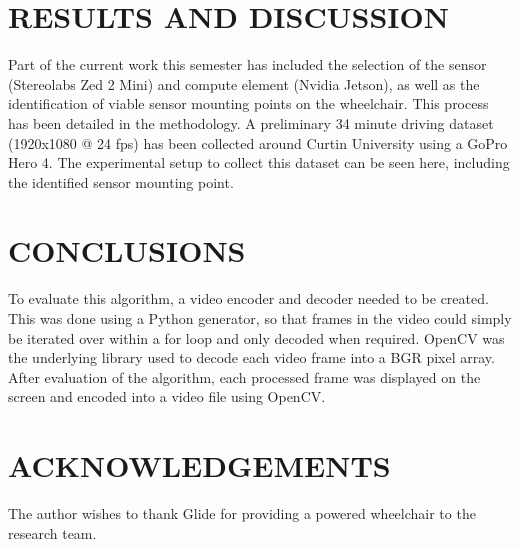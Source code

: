 \documentclass[10pt,twoside]{article}
\begin{document}
\section*{\textbf{RESULTS AND DISCUSSION}} %
Part of the current work this semester has included the selection of the sensor (Stereolabs Zed 2 Mini) and compute element (Nvidia Jetson),
as well as the identification of viable sensor mounting points on the wheelchair. This process has been detailed in the methodology.
A preliminary 34 minute driving dataset (1920x1080 @ 24 fps) has been collected around Curtin University using a GoPro Hero 4.
The experimental setup to collect this dataset can be seen here, including the identified
sensor mounting point.

\section*{\textbf{CONCLUSIONS}} %
To evaluate this algorithm, a video encoder and decoder needed to be created. This was done using a Python generator,
so that frames in the video could simply be iterated over within a for loop and only decoded when required.
OpenCV \autocite{vuHybridNetsEndtoEndPerception2022} was the underlying library used to decode each video frame into a BGR pixel array.
After evaluation of the algorithm, each processed frame was displayed on the screen and encoded into a video file using OpenCV.

\section*{\textbf{ACKNOWLEDGEMENTS}}
The author wishes to thank Glide for providing a powered wheelchair to the research team.

\printbibliography[title=\textbf{REFERENCES},heading=bibliography] %
\end{document}
